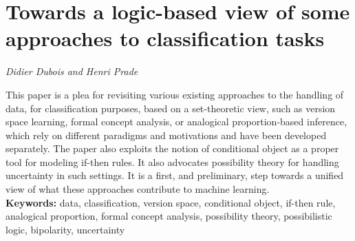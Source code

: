 \documentclass[../booklet.tex]{subfiles}
\begin{document}
\section[Towards a logic-based view of some approaches to classification tasks. {\it Didier Dubois and Henri Prade}]{Towards a logic-based view of some approaches to classification tasks}
 

\begin{center}
  {\it Didier Dubois and Henri Prade}
\end{center}

\vskip 0.8cm


This  paper is a plea for revisiting various existing approaches to the handling of data, for classification purposes, based on a set-theoretic view, such as version space learning, formal concept analysis, or analogical proportion-based inference, which rely on different paradigms and motivations and have been developed separately. The paper also exploits the notion of conditional object as a proper tool for 
modeling if-then rules. It also advocates possibility theory for handling uncertainty in such settings. 
It is a first, and preliminary, step towards a unified view of what these approaches contribute to machine learning. \\

{\bf Keywords:} data, classification, version space, conditional object, if-then rule, analogical proportion, formal concept analysis, possibility theory, possibilistic logic, bipolarity, uncertainty 
\end{document}
